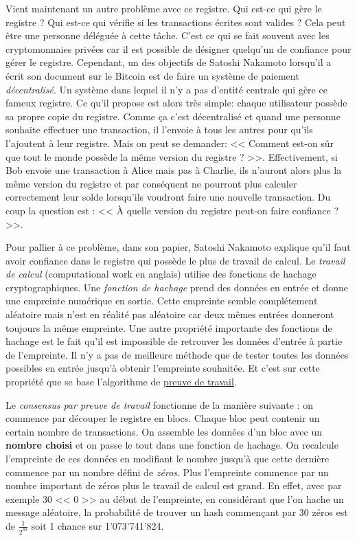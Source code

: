 Vient maintenant un autre problème avec ce registre. Qui est-ce qui gère le registre ? Qui est-ce qui vérifie si les transactions écrites sont valides ? Cela peut être une personne déléguée à cette tâche. C'est ce qui se fait souvent avec les cryptomonnaies privées car il est possible de désigner quelqu'un de confiance pour gérer le registre. Cependant, un des objectifs de Satoshi Nakamoto lorsqu'il a écrit son document sur le Bitcoin est de faire un système de paiement \emph{décentralisé}. Un système dans lequel il n'y a pas d'entité centrale qui gère ce fameux registre. Ce qu'il propose est alors très simple: chaque utilisateur possède sa propre copie du registre. Comme ça c'est décentralisé et quand une personne souhaite effectuer une transaction, il l'envoie à tous les autres pour qu'ils l'ajoutent à leur registre. Mais on peut se demander: << Comment est-on sûr que tout le monde possède la même version du registre ? >>. Effectivement, si Bob envoie une transaction à Alice mais pas à Charlie, ils n'auront alors plus la même version du registre et par conséquent ne pourront plus calculer correctement leur solde lorsqu'ils voudront faire une nouvelle transaction. Du coup la question est : << À quelle version du registre peut-on faire confiance ? >>.

Pour pallier à ce problème, dans son papier, Satoshi Nakamoto explique qu'il faut avoir confiance dans le registre qui possède le plus de travail de calcul. Le \emph{travail de calcul} (computational work en anglais) utilise des fonctions de hachage cryptographiques. Une \emph{fonction de hachage} prend des données en entrée et donne une empreinte numérique en sortie. Cette empreinte semble complétement aléatoire mais n'est en réalité pas aléatoire car deux mêmes entrées donneront toujours la même empreinte. Une autre propriété importante des fonctions de hachage est le fait qu'il est impossible de retrouver les données d'entrée à partie de l'empreinte. Il n'y a pas de meilleure méthode que de tester toutes les données possibles en entrée jusqu'à obtenir l'empreinte souhaitée. Et c'est sur cette propriété que se base l'algorithme de \hyperref[consensus:pow]{preuve de travail}.

Le \emph{consensus par preuve de travail} fonctionne de la manière suivante : on commence par découper le registre en blocs. Chaque bloc peut contenir un certain nombre de transactions. On assemble les données d'un bloc avec un \textbf{nombre choisi} et on passe le tout dans une fonction de hachage. On recalcule l'empreinte de ces données en modifiant le nombre jusqu'à que cette dernière commence par un nombre défini de \emph{zéros}. Plus l'empreinte commence par un nombre important de zéros plus le travail de calcul est grand. En effet, avec par exemple 30 << 0 >> au début de l'empreinte, en considérant que l'on hache un message aléatoire, la probabilité de trouver un hash commençant par 30 zéros est de $\frac{1}{2^{30}}$ soit 1 chance sur 1'073'741'824. 

